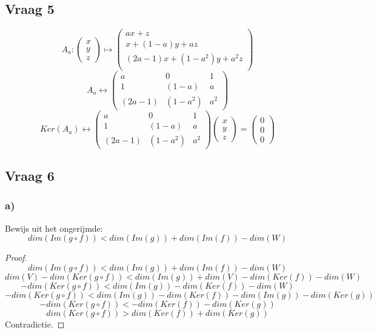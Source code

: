 \documentclass[lineaire_algebra_oplossingen.tex]{subfiles}
\begin{document}
\subsection{Vraag 5}
\[
A_a:
\begin{pmatrix}
x\\y\\z
\end{pmatrix}
\mapsto
\begin{pmatrix}
ax+z\\
x+(1-a)y+az\\
(2a-1)x+(1-a^2)y+a^2z\\
\end{pmatrix}
\]
\[
A_a \leftrightarrow
\begin{pmatrix}
a & 0 & 1\\
1 & (1-a) & a\\
(2a-1) & (1-a^2) & a^2
\end{pmatrix}
\]
\[
Ker(A_a) \leftrightarrow
\begin{pmatrix}
a & 0 & 1\\
1 & (1-a) & a\\
(2a-1) & (1-a^2) & a^2
\end{pmatrix}
\begin{pmatrix}
x\\y\\z
\end{pmatrix}
=
\begin{pmatrix}
0\\0\\0
\end{pmatrix}
\]

\subsection{Vraag 6}
\subsubsection*{a)}
Bewijs uit het ongerijmde:
\[
dim(Im(g\circ f)) < dim(Im(g)) + dim(Im(f)) - dim(W)
\]
\begin{proof}
\[
dim(Im(g\circ f)) < dim(Im(g)) + dim(Im(f)) - dim(W)
\]
\[
dim(V) - dim(Ker(g\circ f)) < dim(Im(g)) + dim(V) - dim(Ker(f)) - dim(W)
\]
\[
-dim(Ker(g\circ f)) < dim(Im(g)) - dim(Ker(f)) - dim(W)
\]
\[
-dim(Ker(g\circ f)) < dim(Im(g)) - dim(Ker(f)) - dim(Im(g)) - dim(Ker(g))
\]
\[
-dim(Ker(g\circ f)) < - dim(Ker(f)) - dim(Ker(g))
\]
\[
dim(Ker(g\circ f)) > dim(Ker(f)) + dim(Ker(g))
\]
Contradictie.
\end{proof}
\end{document}
